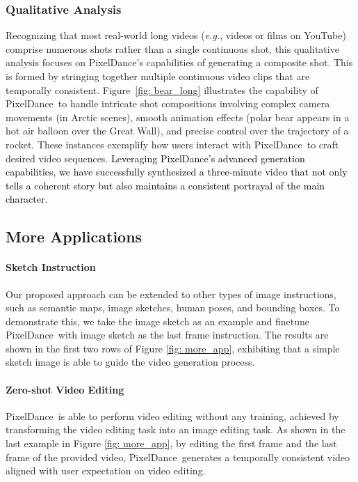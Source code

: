 \documentclass[10pt,twocolumn,letterpaper]{article}
\newcommand{\tcr}{\textcolor{black}}
\newcommand{\ours}{{PixelDance}}
\begin{document}
\subsubsection{Qualitative Analysis} 
Recognizing that most real-world long videos (\textit{e.g.}, videos or films on YouTube) comprise numerous shots rather than a single continuous shot, this qualitative analysis focuses on \ours's capabilities of generating a composite shot. This is formed by stringing together multiple continuous video clips that are temporally consistent. Figure~\ref{fig: bear_long} illustrates the capability of \ours~to handle intricate shot compositions involving complex camera movements (in Arctic scenes), smooth animation effects (polar bear appears in a hot air balloon over the Great Wall), and precise control over the trajectory of a rocket. These instances exemplify how users interact with \ours~to craft desired video sequences. \tcr{Leveraging \ours's advanced generation capabilities, we have successfully synthesized a three-minute video that not only tells a coherent story but also maintains a consistent portrayal of the main character. }




\subsection{More Applications}
\label{sec: more_application}



\paragraph{Sketch Instruction}
Our proposed approach can be extended to other types of image instructions, such as semantic maps, image sketches, human poses, and bounding boxes. To demonstrate this, we take the image sketch as an example and finetune \ours~with image sketch \cite{xie2015HED} as the last frame instruction. The results are shown in the first two rows of Figure \ref{fig: more_app}, exhibiting that a simple sketch image is able to guide the video generation process. 



\paragraph{Zero-shot Video Editing}
\ours~is able to perform video editing without any training, achieved by transforming the video editing task into an image editing task. As shown in the last example in Figure \ref{fig: more_app}, by editing the first frame and the last frame of the provided video, \ours~generates a temporally consistent video aligned with user expectation on video editing. 
\end{document}
